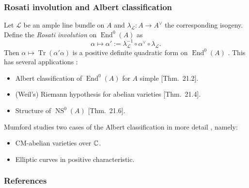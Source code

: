 \documentclass[notheorems, hyperref]{beamer}
\theoremstyle{darkgreentheorem}
\theoremstyle{darkbluedefinition}
\theoremstyle{darkredexample}
\theoremstyle{remark}
\DeclareMathOperator{\End}{End}
\renewcommand{\L}{\mathcal{L}}
\newcommand{\dual}{^{\vee}}
\begin{document}
\begin{frame}
    \frametitle{Rosati involution and Albert classification}
    Let $\L$ be an ample line bundle on $A$ and $\lambda_{\L}\colon A\to A\dual$ the corresponding isogeny.
    Define the \textit{Rosati involution} on $\End^{0}(A)$ as
    \[ \alpha\mapsto \alpha':=\lambda_{\L}^{-1}\circ \alpha\dual \circ \lambda_{\L}. \]
    \pause
    Then $\alpha\mapsto \operatorname{Tr}(\alpha'\alpha)$ is a positive definite quadratic form on $\End^{0}(A)$ \cite[Thm.~21.1]{mum70}.
    \pause
    This has several applications \cite[\S 21]{mum70}:
    \begin{itemize}
	\item Albert classification of $\End^{0}(A)$ for $A$ simple [Thm.~21.2].
	\item (Weil's) Riemann hypothesis for abelian varieties [Thm.~21.4].
	\item Structure of $\operatorname{NS}^{0}(A)$ [Thm.~21.6].
    \end{itemize}
    \pause
    Mumford studies two cases of the Albert classification in more detail \cite[\S 22]{mum70}, namely:
    \begin{itemize}
	\item CM-abelian varieties over $\mathbb{C}$.
	\item Elliptic curves in positive characteristic.
    \end{itemize}
\end{frame}

\begin{frame}
    \frametitle{References}
    
    
\end{frame}
\end{document}
